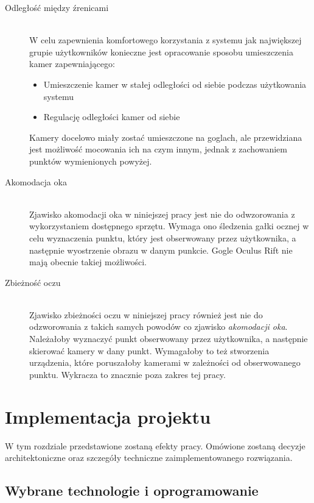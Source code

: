 \documentclass[a4paper,11pt,twoside]{report}
\theoremstyle{definition}
\begin{document}
\begin{description}

\item[Odległość między źrenicami] \hfill \\
W celu zapewnienia komfortowego korzystania z systemu jak największej grupie użytkowników konieczne jest opracowanie sposobu umieszczenia kamer zapewniającego:
\begin{itemize}
\item Umieszczenie kamer w stałej odległości od siebie podczas użytkowania systemu
\item Regulację odległości kamer od siebie
\end{itemize}

Kamery docelowo miały zostać umieszczone na goglach, ale przewidziana jest możliwość mocowania ich na czym innym, jednak z zachowaniem punktów wymienionych powyżej.

\item [Akomodacja oka] \hfill \\
Zjawisko akomodacji oka w niniejszej pracy jest nie do odwzorowania z wykorzystaniem dostępnego sprzętu. Wymaga ono śledzenia gałki ocznej w celu wyznaczenia punktu, który jest obserwowany przez użytkownika, a następnie wyostrzenie obrazu w danym punkcie. Gogle Oculus Rift nie mają obecnie takiej możliwości.

\item[Zbieżność oczu] \hfill \\
Zjawisko zbieżności oczu w niniejszej pracy również jest nie do odzworowania z takich samych powodów co zjawisko \textit{akomodacji oka}. Należałoby wyznaczyć punkt obserwowany przez użytkownika, a następnie skierować kamery w dany punkt. Wymagałoby to też stworzenia urządzenia, które poruszałoby kamerami w zależności od obserwowanego punktu. Wykracza to znacznie poza zakres tej pracy.

\end{description}

\chapter {Implementacja projektu}

W tym rozdziale przedstawione zostaną efekty pracy. Omówione zostaną decyzje architektoniczne oraz szczegóły techniczne zaimplementowanego rozwiązania.

\section {Wybrane technologie i oprogramowanie}
\end{document}
